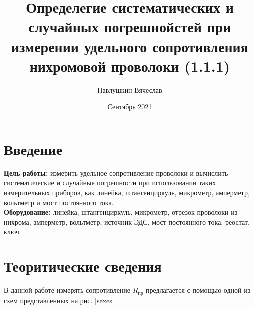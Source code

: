 \documentclass[a4paper, 12pt]{article}
\title{\textbf{Определегие систематических и случайных погрешнойстей при измерении удельного сопротивления нихромовой проволоки (1.1.1)}}
\author{Павлушкин Вячеслав}
\date{Сентябрь 2021}
\begin{document}
	
	
	\maketitle
	      
	
	
	                     
	\section{Введение}
	
	\textbf{Цель работы:} измерить удельное сопротивление проволоки и вычислить систематические и случайные погрешности при использовании таких измерительных приборов, как линейка, штангенциркуль, микрометр, амперметр, вольтметр и мост постоянного тока.
	\bigskip\\
	\textbf{Оборудование:} линейка, штангенциркуль, микрометр, отрезок проволоки из нихрома, амперметр, вольтметр, источник ЭДС, мост постоянного тока, реостат, ключ.
	
	\section{Теоритические сведения}
		
		В данной работе измерять сопротивление $R_\text{пр}$ предлагается с помощью одной из схем представленных на рис. \ref{sexes}
			
\end{document}

